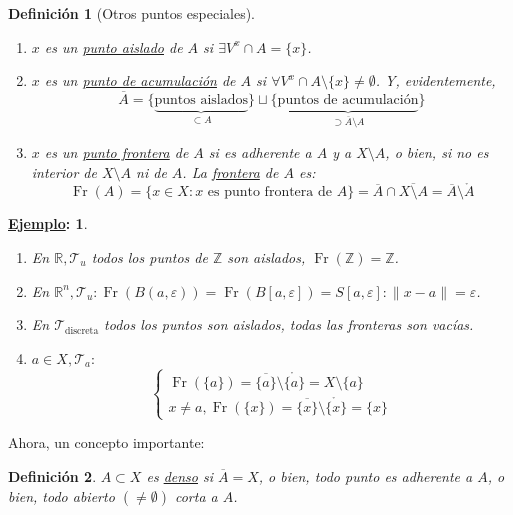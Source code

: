 \documentclass[10pt,a4paper,openright]{book}
\theoremstyle{break}
\newtheorem*{defi}{Definición}
\newtheorem*{ej}{\underline{Ejemplo}:}
\DeclareMathOperator{\fr}{Fr}
\begin{document}
\begin{defi}[Otros puntos especiales]    
\begin{enumerate}
    \item $x$ es un \underline{punto aislado} de $A$ si $\exists V^x \cap A = \{x\}$.
    \item $x$ es un \underline{punto de acumulación} de $A$ si $\forall V^x \cap A \setminus \{x\} \neq \emptyset$. Y, evidentemente,
    \[
    \overline{A} = \{\underbrace{\text{puntos aislados}}_{\subset A}\} \sqcup \{\underbrace{\text{puntos de acumulación}}_{\supset \overline{A} \setminus A}\} 
    \]
    \item $x$ es un \underline{punto frontera} de $A$ si es adherente a $A$ y a $X \setminus A$, o bien, si no es interior de $X \setminus A$ ni de $A$. La \underline{frontera} de $A$ es: 
    \[
    \fr\left( A \right) = \{x \in X: x \text{ es punto frontera de } A\} = \overline{A} \cap \overline{X \setminus A} = \overline{A} \setminus \mathring{A}     
    \]
\end{enumerate}
\end{defi}

\begin{ej}
\begin{enumerate}
    \item En $\mathbb{R}, \mathcal{T}_u$ todos los puntos de $\mathbb{Z}$ son aislados, $\fr\left( \mathbb{Z} \right) = \mathbb{Z}$.
    \item En $\mathbb{R}^n, \mathcal{T}_u: \fr\left( B\left( a, \varepsilon \right) \right) = \fr\left( B\left[ a, \varepsilon \right] \right) = S\left[ a, \varepsilon \right] : \lVert x - a \rVert = \varepsilon$.
    \item En $\mathcal{T}_{\text{discreta}}$ todos los puntos son aislados, todas las fronteras son vacías.
    \item $a \in X, \mathcal{T}_a: $
    \[
    \begin{cases}
        \fr\left( \{a\} \right) = \overline{\{a\}} \setminus \mathring{\{a\}} = X \setminus \{a\}\\
        x \neq a, \fr\left( \{x\} \right) = \overline{\{x\}} \setminus \mathring{\{x\}} = \{x\} 
    \end{cases} 
    \]
\end{enumerate}
\end{ej}

Ahora, un concepto importante:
\begin{defi}
$A \subset X$ es \underline{denso} si $\overline{A} = X$, o bien, todo punto es adherente a $A$, o bien, todo abierto $\left( \neq \emptyset \right)$ corta a $A$.
\end{defi}
\end{document}
